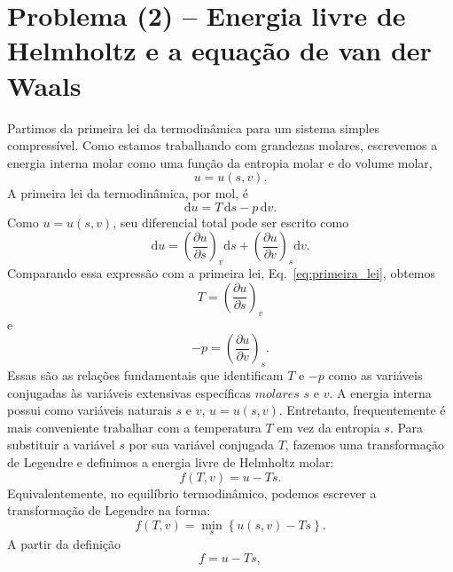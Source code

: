 \documentclass[11pt,a4paper]{article}
\renewcommand{\dd}{\mathrm{d}}
\begin{document}
\section*{Problema (2) -- Energia livre de Helmholtz e a equação de van der Waals}
%
Partimos da primeira lei da termodinâmica para um sistema simples
compressível. Como estamos trabalhando com grandezas molares,
escrevemos a energia interna molar como uma função da entropia molar
e do volume molar,
%
\begin{equation}
    u=u(s,v).
\end{equation}
%
A primeira lei da termodinâmica, por mol, é
%
\begin{equation}
\dd u = T\,\dd s-p\,\dd v.
\label{eq:primeira_lei}
\end{equation}
%
Como $u=u(s,v)$, seu diferencial total pode ser escrito como
%
\begin{equation}
    \dd u
    =
    \left(\frac{\partial u}{\partial s}\right)_v
    \dd s
    +
    \left(\frac{\partial u}{\partial v}\right)_s
    \dd v.
\end{equation}
%
Comparando essa expressão com a primeira lei, Eq.~\eqref{eq:primeira_lei}, obtemos
%
\begin{equation}
    T=
    \left(\frac{\partial u}{\partial s}\right)_v
    \label{eq:T}
\end{equation}
%
e
%
\begin{equation}
    -p=
    \left(\frac{\partial u}{\partial v}\right)_s.
    \label{eq:p}
\end{equation}
%
Essas são as relações fundamentais que identificam $T$ e $-p$
como as variáveis conjugadas às variáveis extensivas específicas
$molares$ $s$ e $v$.  A energia interna possui como variáveis naturais $s$ e $v$,  $u=u(s,v)$. Entretanto, frequentemente é mais conveniente trabalhar com a temperatura $T$ em vez da entropia $s$.
Para substituir a variável $s$ por sua variável conjugada $T$,
fazemos uma transformação de Legendre e definimos a energia livre
de Helmholtz molar:
%
\begin{equation}
    f(T,v)=u-Ts.
    \label{eq:helmholtz}
\end{equation}
%
Equivalentemente, no equilíbrio termodinâmico, podemos escrever
a transformação de Legendre na forma:
%
\begin{equation}
    f(T,v)
    =
    \min_s
    \left\{
        u(s,v)-Ts
    \right\}.
    \label{eq:legendre}
\end{equation}
%
A partir da definição
%
\begin{equation}
    f=u-Ts,
\end{equation}
\end{document}
